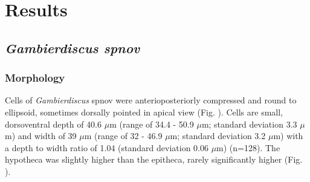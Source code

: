 \documentclass[12pt]{article}
\begin{document}
\newpage
\section{Results}

\subsection{\emph{Gambierdiscus spnov}}
\subsubsection{Morphology}
Cells of\textit{ Gambierdiscus }spnov were anterioposteriorly compressed and round to ellipsoid, sometimes dorsally pointed in apical view (Fig. ). Cells are small, dorsoventral depth of 40.6 $\mu$m (range of 34.4 - 50.9 $\mu$m; standard deviation 3.3 $\mu$m) and width of 39 $\mu$m (range of 32 - 46.9 $\mu$m; standard deviation 3.2 $\mu$m) with a depth to width ratio of 1.04 (standard deviation 0.06 $\mu$m) (n=128). The hypotheca was slightly higher than the epitheca, rarely significantly higher (Fig. ).
\end{document}
